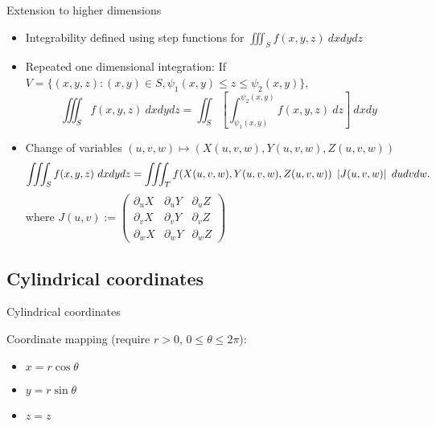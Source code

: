 




% 


{Extension to higher dimensions}



\begin{itemize}
    \item Integrability defined using step functions for \(\iiint_{S} f(x,y,z) \ dxdydz\)
    \item Repeated one dimensional integration: If \(V = \{(x,y,z) : (x,y) \in S, \psi_1(x,y) \leq z \leq \psi_2(x,y)\}\),
          \[
              \iiint_{S} f(x,y,z) \ dxdydz = \iint_{S} \left[\int_{\psi_1(x,y)}^{\psi_2(x,y)} f(x,y,z)\ dz\right] \ dxdy
          \]
    \item Change of variables \((u,v,w) \mapsto (X(u,v,w),Y(u,v,w),Z(u,v,w))\)
          \[
              \iiint_{S} f(x,y,z) \ dxdydz = \iiint_{T} f(X(u,v,w),Y(u,v,w),Z(u,v,w)) \ \left|J(u,v,w)\right| \ dudvdw.
          \]
          where
          \(J(u,v):= \begin{pmatrix}
              \partial_u X & \partial_u Y & \partial_u Z \\ \partial_v X & \partial_v Y & \partial_v Z \\ \partial_w X & \partial_w Y & \partial_w Z
          \end{pmatrix}\)
\end{itemize}



\subsection{Cylindrical coordinates}


{Cylindrical coordinates}



Coordinate mapping (require \(r>0\), \(0\leq \theta \leq 2\pi\)):
\begin{itemize}
    \item \(x = r \cos \theta\)
    \item \(y = r \sin \theta\)
    \item \(z = z\)
\end{itemize}



